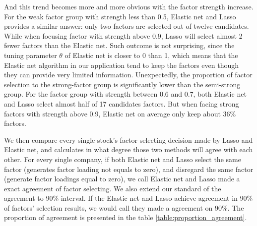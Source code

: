 And this trend becomes more and more obvious with the factor strength increase.
For the weak factor group with strength less than 0.5, Elastic net and Lasso provides a similar answer: only two factors are selected out of twelve candidates.
While when focusing factor with strength above 0.9, Lasso will select almost 2 fewer factors than the Elastic net.
Such outcome is not surprising, since the tuning parameter $\theta$ of Elastic net is closer to 0 than 1, which means that the Elastic net algorithm in our application tend to keep the factors even though they can provide very limited information.
Unexpectedly, the proportion of factor selection to the strong-factor group is significantly lower than the semi-strong group.
For the factor group with strength between 0.6 and 0.7, both Elastic net and Lasso select almost half of 17 candidates factors. 
But when facing strong factors with strength above 0.9, Elastic net on average only keep about 36\% factors.


We then compare every single stock's factor selecting decision made by Lasso and Elastic net, and calculates in what degree those two methods will agree with each other.
For every single company, if both Elastic net and Lasso select the same factor (generates factor loading not equals to zero), and disregard the same factor (generate factor loadings equal to zero), we call Elastic net and Lasso made a exact agreement of factor selecting.
We also extend our standard of the agreement to 90\% interval. 
If the Elastic net and Lasso achieve agreement in 90\% of factors' selection results, we would call they made a agreement on 90\%.
The proportion of agreement is presented in the table \ref{table:proportion_agreement}.

